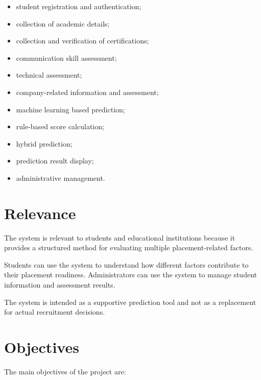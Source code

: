 \documentclass[12pt,a4paper]{report}
\begin{document}
\begin{itemize}
    \item student registration and authentication;
    \item collection of academic details;
    \item collection and verification of certifications;
    \item communication skill assessment;
    \item technical assessment;
    \item company-related information and assessment;
    \item machine learning based prediction;
    \item rule-based score calculation;
    \item hybrid prediction;
    \item prediction result display;
    \item administrative management.
\end{itemize}

\section{Relevance}

The system is relevant to students and educational institutions
because it provides a structured method for evaluating multiple
placement-related factors.

Students can use the system to understand how different factors
contribute to their placement readiness. Administrators can use
the system to manage student information and assessment results.

The system is intended as a supportive prediction tool and not
as a replacement for actual recruitment decisions.

\section{Objectives}

The main objectives of the project are:
\end{document}
